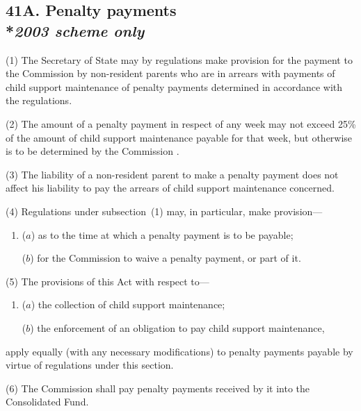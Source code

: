 \documentclass[12pt,a4paper]{article}
\begin{document}
\subsection[41A. Penalty payments --- \emph{2003 scheme only}]{41A. Penalty payments\\*\emph{2003 scheme only}}

(1) The Secretary of State may by regulations make provision for the payment to 
the Commission  %
by non-resident parents who are in arrears with payments of child support maintenance of penalty payments determined in accordance with the regulations.

(2) The amount of a penalty payment in respect of any week may not exceed 25\% of the amount of child support maintenance payable for that week, but otherwise is to be determined by the 
Commission%
.

(3) The liability of a non-resident parent to make a penalty payment does not affect his liability to pay the arrears of child support maintenance concerned.

(4) Regulations under subsection~(1)  may, in particular, make provision—
\begin{enumerate}\item[]
($a$) as to the time at which a penalty payment is to be payable;

($b$) for the 
Commission  %
to waive a penalty payment, or part of it.
\end{enumerate}

(5) The provisions of this Act with respect to—
\begin{enumerate}\item[]
($a$) the collection of child support maintenance;

($b$) the enforcement of an obligation to pay child support maintenance,
\end{enumerate}
apply equally (with any necessary modifications) to penalty payments payable by virtue of regulations under this section.

(6) The 
Commission  %
shall pay penalty payments received by 
it  %
into the Consolidated Fund.

\end{document}
